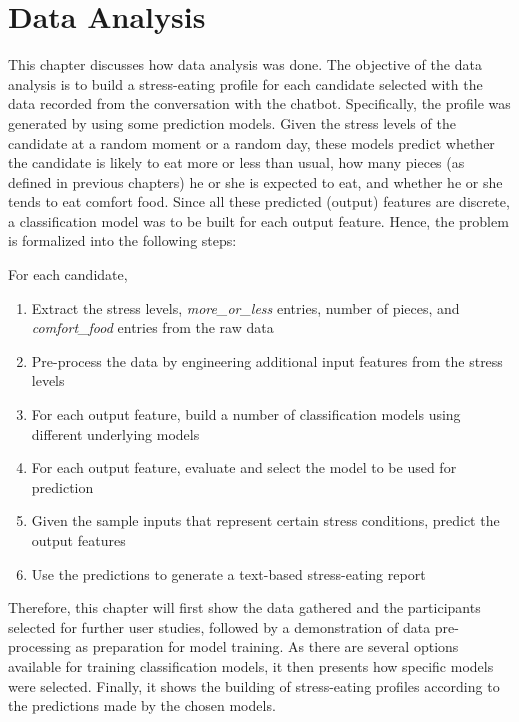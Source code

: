 
\chapter{Data Analysis}\label{chapter:data_analysis}
This chapter discusses how data analysis was done. The objective of the data analysis is to build a stress-eating profile for each candidate selected with the data recorded from the conversation with the chatbot. Specifically, the profile was generated by using some prediction models. Given the stress levels of the candidate at a random moment or a random day, these models predict whether the candidate is likely to eat more or less than usual, how many pieces (as defined in previous chapters) he or she is expected to eat, and whether he or she tends to eat comfort food. Since all these predicted (output) features are discrete, a classification model was to be built for each output feature. Hence, the problem is formalized into the following steps:\bigskip

\noindent For each candidate,
\begin{enumerate}
  \item Extract the stress levels, \emph{more\_or\_less} entries, number of pieces, and \emph{comfort\_food} entries from the raw data
  \item Pre-process the data by engineering additional input features from the stress levels
  \item For each output feature, build a number of classification models using different underlying models
  \item For each output feature, evaluate and select the model to be used for prediction
  \item Given the sample inputs that represent certain stress conditions, predict the output features
  \item Use the predictions to generate a text-based stress-eating report
\end{enumerate}

Therefore, this chapter will first show the data gathered and the participants selected for further user studies, followed by a demonstration of data pre-processing as preparation for model training. As there are several options available for training classification models, it then presents how specific models were selected. Finally, it shows the building of stress-eating profiles according to the predictions made by the chosen models.


